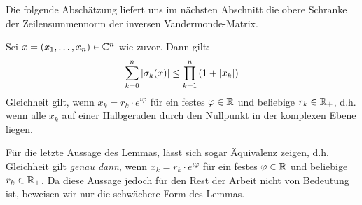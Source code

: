 Die folgende Abschätzung liefert uns im nächsten Abschnitt die obere Schranke
der Zeilensummennorm der inversen Vandermonde-Matrix.
\begin{lemma}
    \label{lemma:elementary_symmetric_polynomials_inequality}
    Sei $x = (x_1, \dots, x_n) \in \mathbb{C}^n$ wie zuvor.
    Dann gilt:
    \begin{equation}
        \label{eq:elementary_symmetric_polynomials_inequality}
        \sum_{k=0}^{n} \left\lvert \sigma_{k}(x) \right\rvert \leq \prod_{k=1}^{n} \left( 1 + \left\lvert x_k \right\rvert \right)
    \end{equation}
    Gleichheit gilt, wenn $x_k = r_k \cdot e^{i\varphi}$ für ein
    festes $\varphi \in \mathbb{R}$ und beliebige $r_k \in \mathbb{R}_+$,
    d.h. wenn alle $x_k$ auf einer Halbgeraden durch den Nullpunkt
    in der komplexen Ebene liegen.
\end{lemma}

\begin{remark}
    Für die letzte Aussage des Lemmas, lässt sich sogar Äquivalenz zeigen, d.h.
    Gleichheit gilt \emph{genau dann}, wenn $x_k = r_k \cdot e^{i\varphi}$ für
    ein festes $\varphi \in \mathbb{R}$ und beliebige $r_k \in \mathbb{R}_+$.
    Da diese Aussage jedoch für den Rest der Arbeit nicht von Bedeutung ist,
    beweisen wir nur die schwächere Form des Lemmas.
\end{remark}

